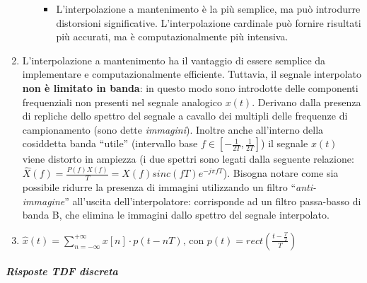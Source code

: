 \documentclass[
]{article}
\providecommand{\tightlist}{%
  \setlength{\itemsep}{0pt}\setlength{\parskip}{0pt}}
\begin{document}
\begin{enumerate}
\begin{itemize}
    \begin{itemize}
    \tightlist
    \item
      L'interpolazione a mantenimento è la più semplice, ma può
      introdurre distorsioni significative. L'interpolazione cardinale
      può fornire risultati più accurati, ma è computazionalmente più
      intensiva.
    \end{itemize}
  \end{itemize}
\item
  L'interpolazione a mantenimento ha il vantaggio di essere semplice da
  implementare e computazionalmente efficiente. Tuttavia, il segnale
  interpolato \textbf{non è limitato in banda}: in questo modo sono
  introdotte delle componenti frequenziali non presenti nel segnale
  analogico \(x(t)\). Derivano dalla presenza di repliche dello spettro
  del segnale a cavallo dei multipli delle frequenze di campionamento
  (sono dette \emph{immagini}). Inoltre anche all'interno della
  cosiddetta banda ``utile'' (intervallo base
  \(f \in[-\frac{1}{2T}, \frac{1}{2T}]\)) il segnale \(x(t)\) viene
  distorto in ampiezza (i due spettri sono legati dalla seguente
  relazione:
  \(\hat{X}(f)=\frac{P(f)X(f)}{T}=X(f)sinc(fT)e^{-j\pi fT}\)). Bisogna
  notare come sia possibile ridurre la presenza di immagini utilizzando
  un filtro ``\emph{anti-immagine}'' all'uscita dell'interpolatore:
  corrisponde ad un filtro passa-basso di banda B, che elimina le
  immagini dallo spettro del segnale interpolato.
\item
  \(\hat{x}(t)=\sum_{n=-\infty}^{+\infty}x[n]\cdot p(t-nT)\text{, con } p(t)= rect(\frac{t-\frac{T}{2}}{T})\)
\end{enumerate}

\subparagraph{Risposte TDF discreta}\label{risposte-tdf-discreta}
\end{document}
